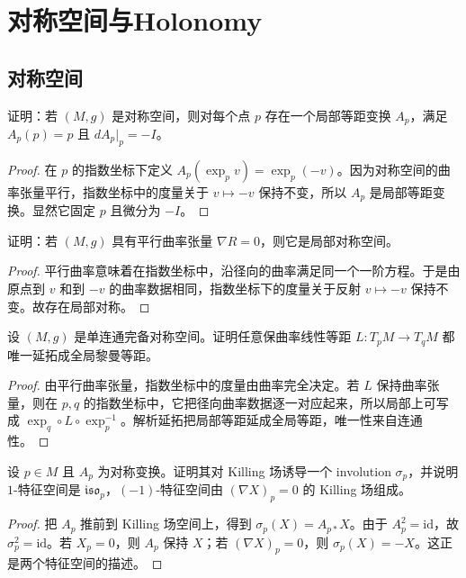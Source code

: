 \documentclass[11pt,a4paper,openany]{ctexbook}
\numberwithin{equation}{chapter}
\begin{document}
\chapter{对称空间与Holonomy}

\section{对称空间}

\begin{problem}
证明：若 \((M,g)\) 是对称空间，则对每个点 \(p\) 存在一个局部等距变换 \(A_p\)，满足 \(A_p(p)=p\) 且 \(dA_p|_p=-I\)。
\end{problem}
\begin{proof}
在 \(p\) 的指数坐标下定义 \(A_p(\exp_p v)=\exp_p(-v)\)。因为对称空间的曲率张量平行，指数坐标中的度量关于 \(v\mapsto -v\) 保持不变，所以 \(A_p\) 是局部等距变换。显然它固定 \(p\) 且微分为 \(-I\)。
\end{proof}

\begin{problem}
证明：若 \((M,g)\) 具有平行曲率张量 \(\nabla R=0\)，则它是局部对称空间。
\end{problem}
\begin{proof}
平行曲率意味着在指数坐标中，沿径向的曲率满足同一个一阶方程。于是由原点到 \(v\) 和到 \(-v\) 的曲率数据相同，指数坐标下的度量关于反射 \(v\mapsto -v\) 保持不变。故存在局部对称。
\end{proof}

\begin{problem}
设 \((M,g)\) 是单连通完备对称空间。证明任意保曲率线性等距 \(L:T_pM\to T_qM\) 都唯一延拓成全局黎曼等距。
\end{problem}
\begin{proof}
由平行曲率张量，指数坐标中的度量由曲率完全决定。若 \(L\) 保持曲率张量，则在 \(p,q\) 的指数坐标中，它把径向曲率数据逐一对应起来，所以局部上可写成 \(\exp_q\circ L\circ \exp_p^{-1}\)。解析延拓把局部等距延成全局等距，唯一性来自连通性。
\end{proof}

\begin{problem}
设 \(p\in M\) 且 \(A_p\) 为对称变换。证明其对 Killing 场诱导一个 involution \(\sigma_p\)，并说明 \(1\)-特征空间是 \( \mathfrak{iso}_p\)，\((-1)\)-特征空间由 \((\nabla X)_p=0\) 的 Killing 场组成。
\end{problem}
\begin{proof}
把 \(A_p\) 推前到 Killing 场空间上，得到 \(\sigma_p(X)=A_{p*}X\)。由于 \(A_p^2=\mathrm{id}\)，故 \(\sigma_p^2=\mathrm{id}\)。若 \(X_p=0\)，则 \(A_p\) 保持 \(X\)；若 \((\nabla X)_p=0\)，则 \(\sigma_p(X)=-X\)。这正是两个特征空间的描述。
\end{proof}
\end{document}
